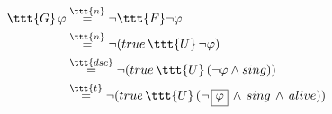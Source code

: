 \documentclass[11pt]{article}
\begin{document}
$\begin{aligned}
     \ttt{G}\,\varphi &\overset{\ttt{n}}{=} \neg \ttt{F}\neg \varphi \\
     &\overset{\ttt{n}}{=} \neg (true\,\ttt{U}\,\neg\varphi) \\
     &\overset{\ttt{dsc}}{=}\neg (true\,\ttt{U}\,(\neg\varphi \land sing)) \\
     &\overset{\ttt{t}}{=}\neg (true\,\ttt{U}\,(\neg\,\boxed\varphi\,\land\,sing\,\land\,alive))
\end{aligned}$
\end{document}
